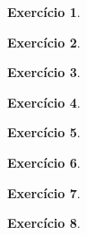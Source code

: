 \documentclass[letter,11pt]{article}
\newtheorem{exer}{Exercício}
\begin{document}
\begin{exer} \rm
% 
\end{exer}


\begin{exer} \rm
\end{exer}


\begin{exer} \rm
\end{exer}


\begin{exer} \rm
\end{exer}


\begin{exer} \rm
\end{exer}


\begin{exer} \rm
\end{exer}


\begin{exer} \rm
\end{exer}

\begin{exer} \rm
\end{exer}
\end{document}
